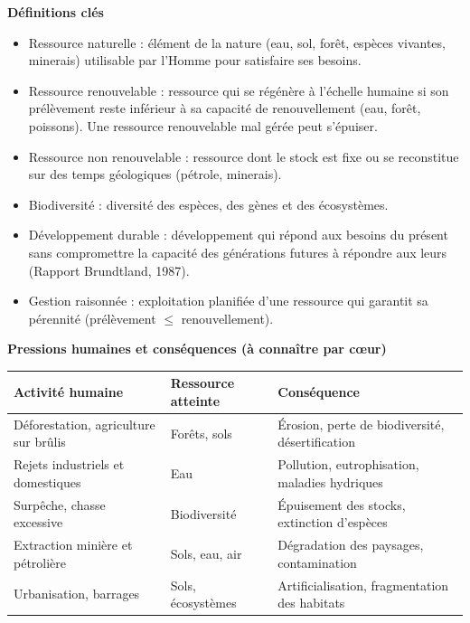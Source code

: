 \documentclass[11pt]{article}
\newcommand{\cle}[1]{{\popxbold\color{popdark}#1}}
\begin{document}
\begin{bilan}
\textbf{Définitions clés}
\begin{itemize}
  \item \cle{Ressource naturelle} : élément de la nature (eau, sol, forêt, espèces vivantes, minerais) utilisable par l'Homme pour satisfaire ses besoins.
  \item \cle{Ressource renouvelable} : ressource qui se régénère à l'échelle humaine si son prélèvement reste inférieur à sa capacité de renouvellement (eau, forêt, poissons). Une ressource renouvelable mal gérée peut s'épuiser.
  \item \cle{Ressource non renouvelable} : ressource dont le stock est fixe ou se reconstitue sur des temps géologiques (pétrole, minerais).
  \item \cle{Biodiversité} : diversité des espèces, des gènes et des écosystèmes.
  \item \cle{Développement durable} : développement qui répond aux besoins du présent sans compromettre la capacité des générations futures à répondre aux leurs (Rapport Brundtland, 1987).
  \item \cle{Gestion raisonnée} : exploitation planifiée d'une ressource qui garantit sa pérennité (prélèvement $\leq$ renouvellement).
\end{itemize}

\textbf{Pressions humaines et conséquences (à connaître par c\oe ur)}
\begin{center}
\begin{tabularx}{\linewidth}{|l|X|X|}
\hline
\rowcolor{popblueL} \textbf{Activité humaine} & \textbf{Ressource atteinte} & \textbf{Conséquence} \\
\hline
Déforestation, agriculture sur brûlis & Forêts, sols & Érosion, perte de biodiversité, désertification \\
\hline
Rejets industriels et domestiques & Eau & Pollution, eutrophisation, maladies hydriques \\
\hline
Surpêche, chasse excessive & Biodiversité & Épuisement des stocks, extinction d'espèces \\
\hline
Extraction minière et pétrolière & Sols, eau, air & Dégradation des paysages, contamination \\
\hline
Urbanisation, barrages & Sols, écosystèmes & Artificialisation, fragmentation des habitats \\
\hline
\end{tabularx}
\end{center}


\end{bilan}
\end{document}
